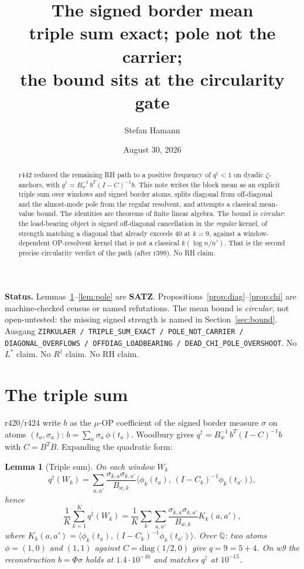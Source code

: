 \documentclass[11pt]{article}
\title{\bfseries The signed border mean\\[2mm]
\large triple sum exact; pole not the carrier;\\
the bound sits at the circularity gate}
\author{Stefan Hamann}
\date{August 30, 2026}
\newtheorem{lemma}{Lemma}
\theoremstyle{remark}
\newcommand{\qd}{q^{\dagger}}
\begin{document}
\maketitle

\begin{abstract}\noindent
r442 reduced the remaining RH path to a positive frequency
of $\qd<1$ on dyadic $\zeta$-anchors, with
$\qd=B_w^{-1}\,b^{T}(I-C)^{-1}b$.
This note writes the block mean as an explicit triple sum
over windows and signed border atoms, splits diagonal from
off-diagonal and the almost-mode pole from the regular
resolvent, and attempts a classical mean-value bound.
The identities are theorems of finite linear algebra.
The bound is \emph{circular}: the load-bearing object is
signed off-diagonal cancellation in the \emph{regular}
kernel, of strength matching a diagonal that already
exceeds $40$ at $k=9$, against a window-dependent
OP-resolvent kernel that is not a classical
$k(\log n/n')$.  That is the second precise circularity
verdict of the path (after r399).  No RH claim.
\end{abstract}

\medskip\noindent
\textbf{Status.}\enspace
Lemmas~\ref{lem:triple}--\ref{lem:pole} are \textbf{SATZ}.
Propositions~\ref{prop:diag}--\ref{prop:chi} are
machine-checked census or named refutations.
The mean bound is \emph{circular}, not open-untested:
the missing signed strength is named in
Section~\ref{sec:bound}.
Ausgang
\texttt{ZIRKULAER / TRIPLE\_SUM\_EXACT / POLE\_NOT\_CARRIER / DIAGONAL\_OVERFLOWS / OFFDIAG\_LOADBEARING / DEAD\_CHI\_POLE\_OVERSHOOT}.
No $L^{*}$ claim.  No $R^{\dagger}$ claim.  No RH claim.

\section{The triple sum}\label{sec:triple}

r420/r424 write $b$ as the $\mu$-OP coefficient of the
signed border measure $\sigma$ on atoms $(t_a,\sigma_a)$:
$b=\sum_a\sigma_a\,\phi(t_a)$.
Woodbury gives $\qd=B_w^{-1}\,b^{T}(I-C)^{-1}b$ with
$C=B^{T}B$.  Expanding the quadratic form:

\begin{lemma}[Triple sum]\label{lem:triple}
On each window $W_k$
\[
\qd(W_k)
=\sum_{a,a'}
\frac{\sigma_{k,a}\sigma_{k,a'}}{B_{w,k}}
\bigl\langle
\phi_k(t_a),\,(I-C_k)^{-1}\phi_k(t_{a'})
\bigr\rangle,
\]
hence
\[
\frac1K\sum_{k=1}^K\qd(W_k)
=\frac1K\sum_{k}\sum_{a,a'}
\frac{\sigma_{k,a}\sigma_{k,a'}}{B_{w,k}}
K_k(a,a'),
\]
where $K_k(a,a')=\langle\phi_k(t_a),(I-C_k)^{-1}\phi_k(t_{a'})\rangle$.
Over $\mathbb{Q}$: two atoms $\phi=(1,0)$ and $(1,1)$
against $C=\mathrm{diag}(1/2,0)$ give $q=9=5+4$.
On w9 the reconstruction $b=\Phi\sigma$ holds at
$1.4\cdot 10^{-16}$ and matches $\qd$ at $10^{-15}$.
\end{lemma}
\end{document}
